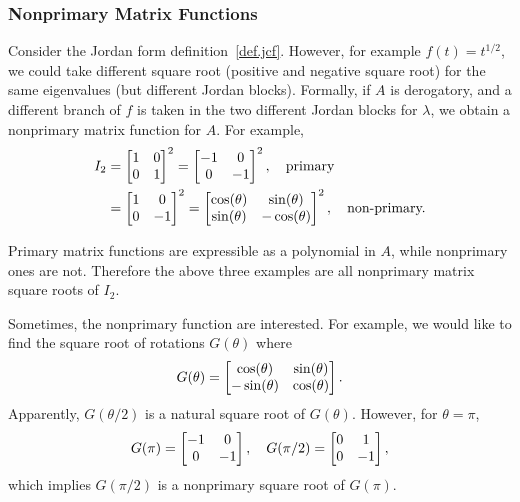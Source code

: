 \documentclass{article}
\begin{document}
\subsubsection{Nonprimary Matrix Functions}
Consider the Jordan form definition~\ref{def.jcf}. However, for example
$f(t) = t^{1/2}$, we could take different square root (positive and
negative square root) for the same eigenvalues (but different Jordan
blocks). Formally, if $A$ is derogatory, and a different branch of $f$
is taken in the two different Jordan blocks for $\lambda$, we obtain a
nonprimary matrix function for $A$. For example,
\begin{equation}\notag
    \begin{aligned}
        I_2 & = 
        \begin{bmatrix}
            1 & 0 \\ 0 & 1
        \end{bmatrix}^2 = 
        \begin{bmatrix}
            -1 & 0 \\ 0 & -1 
        \end{bmatrix}^2, \quad \text{primary} \\
        & = 
        \begin{bmatrix}
            1 & 0 \\ 0 & -1 
        \end{bmatrix}^2 = 
        \begin{bmatrix}
            \cos(\theta) & \sin(\theta) \\ \sin(\theta) & -\cos(\theta)
        \end{bmatrix}^2, \quad \text{non-primary.}
    \end{aligned}
\end{equation}

Primary matrix functions are expressible as a polynomial in $A$, while
nonprimary ones are not. Therefore the above three examples are all
nonprimary matrix square roots of $I_2$.

Sometimes, the nonprimary function are interested. For example, we would
like to find the square root of rotations $G(\theta)$ where 
\begin{equation}\notag
    G(\theta) = 
    \begin{bmatrix}
        \cos(\theta) & \sin(\theta) \\ -\sin(\theta) & \cos(\theta)
    \end{bmatrix}.
\end{equation}
Apparently, $G(\theta/2)$ is a natural square root of $G(\theta)$.
However, for $\theta = \pi$,
\begin{equation}\notag
    G(\pi) = 
    \begin{bmatrix}
        -1 & 0 \\ 0 & -1
    \end{bmatrix}, \quad 
    G(\pi/2) = 
    \begin{bmatrix}
        0 & 1 \\ 0 & -1
    \end{bmatrix},
\end{equation}
which implies $G(\pi/2)$ is a nonprimary square root of $G(\pi)$.
\end{document}

